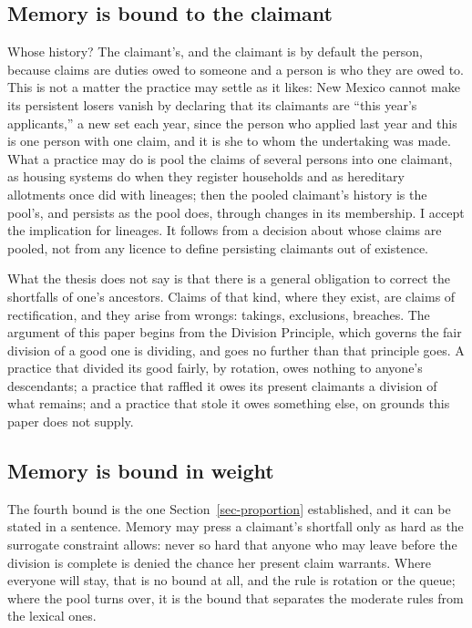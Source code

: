 \documentclass[
  11pt,
  letterpaper,
  DIV=11,
  numbers=noendperiod,
  twoside]{scrartcl}
\begin{document}
\subsection{Memory is bound to the
claimant}\label{memory-is-bound-to-the-claimant}

Whose history? The claimant's, and the claimant is by default the
person, because claims are duties owed to someone and a person is who
they are owed to. This is not a matter the practice may settle as it
likes: New Mexico cannot make its persistent losers vanish by declaring
that its claimants are ``this year's applicants,'' a new set each year,
since the person who applied last year and this is one person with one
claim, and it is she to whom the undertaking was made. What a practice
may do is pool the claims of several persons into one claimant, as
housing systems do when they register households and as hereditary
allotments once did with lineages; then the pooled claimant's history is
the pool's, and persists as the pool does, through changes in its
membership. I accept the implication for lineages. It follows from a
decision about whose claims are pooled, not from any licence to define
persisting claimants out of existence.

What the thesis does not say is that there is a general obligation to
correct the shortfalls of one's ancestors. Claims of that kind, where
they exist, are claims of rectification, and they arise from wrongs:
takings, exclusions, breaches. The argument of this paper begins from
the Division Principle, which governs the fair division of a good one is
dividing, and goes no further than that principle goes. A practice that
divided its good fairly, by rotation, owes nothing to anyone's
descendants; a practice that raffled it owes its present claimants a
division of what remains; and a practice that stole it owes something
else, on grounds this paper does not supply.

\subsection{Memory is bound in weight}\label{memory-is-bound-in-weight}

The fourth bound is the one Section~\ref{sec-proportion} established,
and it can be stated in a sentence. Memory may press a claimant's
shortfall only as hard as the surrogate constraint allows: never so hard
that anyone who may leave before the division is complete is denied the
chance her present claim warrants. Where everyone will stay, that is no
bound at all, and the rule is rotation or the queue; where the pool
turns over, it is the bound that separates the moderate rules from the
lexical ones.
\end{document}

